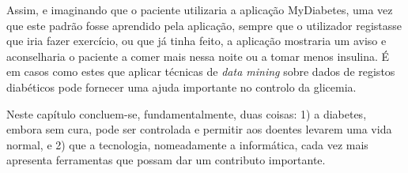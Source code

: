 Assim, e imaginando que o paciente utilizaria a aplicação MyDiabetes, uma vez que este padrão fosse aprendido pela aplicação, sempre que o utilizador registasse que iria fazer exercício, ou que já tinha feito, a aplicação mostraria um aviso e aconselharia o paciente a comer mais nessa noite ou a tomar menos insulina. É em casos como estes que aplicar técnicas de \textit{data mining} sobre dados de registos diabéticos pode fornecer uma ajuda importante no controlo da glicemia.\newline

Neste capítulo concluem-se, fundamentalmente, duas coisas: 1) a diabetes, embora sem cura, pode ser controlada e permitir aos doentes levarem uma vida normal, e 2) que a tecnologia, nomeadamente a informática, cada vez mais apresenta ferramentas que possam dar um contributo importante. 

